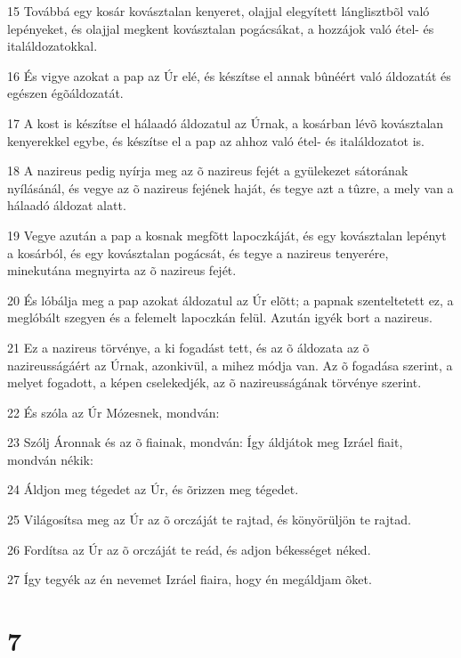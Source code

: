 \par 15 Továbbá egy kosár kovásztalan kenyeret, olajjal elegyített lánglisztbõl való lepényeket, és olajjal megkent kovásztalan pogácsákat, a hozzájok való étel- és italáldozatokkal.
\par 16 És vigye azokat a pap az Úr elé, és készítse el annak bûnéért való áldozatát és egészen égõáldozatát.
\par 17 A kost is készítse el hálaadó áldozatul az Úrnak, a kosárban lévõ kovásztalan kenyerekkel egybe, és készítse el a pap az ahhoz való étel- és italáldozatot is.
\par 18 A nazireus pedig nyírja meg az õ nazireus fejét a gyülekezet sátorának nyílásánál, és vegye az õ nazireus fejének haját, és tegye azt a tûzre, a mely van a hálaadó áldozat alatt.
\par 19 Vegye azután a pap a kosnak megfõtt lapoczkáját, és egy kovásztalan lepényt a kosárból, és egy kovásztalan pogácsát, és tegye a nazireus tenyerére, minekutána megnyirta az õ nazireus fejét.
\par 20 És lóbálja meg a pap azokat áldozatul az Úr elõtt; a papnak szenteltetett ez, a meglóbált szegyen és a felemelt lapoczkán felül. Azután igyék bort a nazireus.
\par 21 Ez a nazireus törvénye, a ki fogadást tett, és az õ áldozata az õ nazireusságáért az Úrnak, azonkivül, a mihez módja van. Az õ fogadása szerint, a melyet fogadott, a képen cselekedjék, az õ nazireusságának törvénye szerint.
\par 22 És szóla az Úr Mózesnek, mondván:
\par 23 Szólj Áronnak és az õ fiainak, mondván: Így áldjátok meg Izráel fiait, mondván nékik:
\par 24 Áldjon meg tégedet az Úr, és õrizzen meg tégedet.
\par 25 Világosítsa meg az Úr az õ orczáját te rajtad, és könyörüljön te rajtad.
\par 26 Fordítsa az Úr az õ orczáját te reád, és adjon békességet néked.
\par 27 Így tegyék az én nevemet Izráel fiaira, hogy én megáldjam õket.

\chapter{7}

